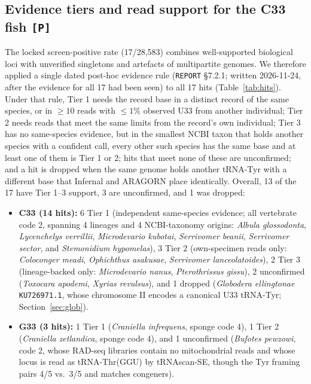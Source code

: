 \documentclass[11pt, a4paper]{article}
\begin{document}
\subsection{Evidence tiers and read support for the C33 fish \texttt{[P]}}
The locked screen-positive rate (17/28,583) combines well-supported biological loci with unverified singletons and artefacts of multipartite genomes. We therefore applied a single dated post-hoc evidence rule (\texttt{REPORT} \S 7.2.1; written 2026-11-24, after the evidence for all 17 had been seen) to all 17 hits (Table~\ref{tab:hits}). Under that rule, Tier 1 needs the record base in a distinct record of the same species, or in $\ge 10$ reads with $\le 1\%$ observed U33 from another individual; Tier 2 needs reads that meet the same limits from the record's own individual; Tier 3 has no same-species evidence, but in the smallest NCBI taxon that holds another species with a confident call, every other such species has the same base and at least one of them is Tier 1 or 2; hits that meet none of these are unconfirmed; and a hit is dropped when the same genome holds another tRNA-Tyr with a different base that Infernal and ARAGORN place identically. Overall, 13 of the 17 have Tier 1--3 support, 3 are unconfirmed, and 1 was dropped:
\begin{itemize}[leftmargin=1.4em, itemsep=0.25em]
\item \textbf{C33 (14 hits):} 6 Tier 1 (independent same-species evidence; all vertebrate code 2, spanning 4 lineages and 4 NCBI-taxonomy origins: \textit{Albula glossodonta}, \textit{Lycenchelys verrillii}, \textit{Microdevario kubotai}, \textit{Serrivomer beanii}, \textit{Serrivomer sector}, and \textit{Stemonidium hypomelas}), 3 Tier 2 (own-specimen reads only: \textit{Coloconger meadi}, \textit{Ophichthus asakusae}, \textit{Serrivomer lanceolatoides}), 2 Tier 3 (lineage-backed only: \textit{Microdevario nanus}, \textit{Pterothrissus gissu}), 2 unconfirmed (\textit{Toxocara apodemi}, \textit{Xyrias revulsus}), and 1 dropped (\textit{Globodera ellingtonae} \texttt{KU726971.1}, whose chromosome II encodes a canonical U33 tRNA-Tyr; Section~\ref{sec:glob}).
\item \textbf{G33 (3 hits):} 1 Tier 1 (\textit{Craniella infrequens}, sponge code 4), 1 Tier 2 (\textit{Craniella zetlandica}, sponge code 4), and 1 unconfirmed (\textit{Bufotes pewzowi}, code 2, whose RAD-seq libraries contain no mitochondrial reads and whose locus is read as tRNA-Thr(GGU) by tRNAscan-SE, though the Tyr framing pairs 4/5 vs.\ 3/5 and matches congeners).
\end{itemize}
\end{document}
